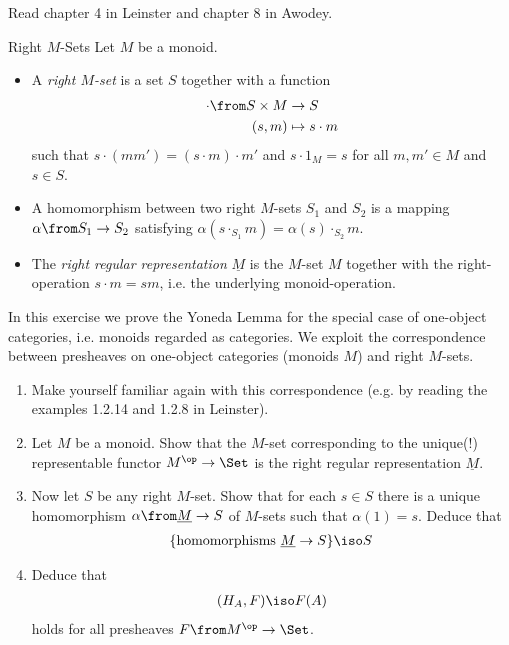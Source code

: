 \def\pathToRoot{../../}



\author{Dominik Wagner}

\begin{hint}
  Read chapter 4 in Leinster and chapter 8 in Awodey.
\end{hint}

\begin{definition}{Right $M$-Sets}
  Let $M$ be a monoid. 
  \begin{itemize}
  \item A \emph{right $M$-set} is a set $S$ together with a function
    \begin{align*}
      \cdot\from S\times M&\to S\\
      (s,m)&\mapsto s\cdot m
    \end{align*}
    such that $s\cdot (mm')=(s\cdot m)\cdot m'$ and $s\cdot 1_M=s$ for all $m,m'\in M$ and $s\in S$.
    \item A homomorphism between two right $M$-sets $S_1$ and $S_2$ is a mapping $\alpha\from S_1\to S_2$ satisfying $\alpha(s\cdot_{S_1} m)=\alpha(s)\cdot_{S_2}m$.
    \item The \emph{right regular representation} $\underline{M}$ is the $M$-set $M$ together with the right-operation $s\cdot m=sm$, i.e. the underlying monoid-operation.
  \end{itemize}

\end{definition}

\begin{exercise}
  In this exercise we prove the Yoneda Lemma for the special case of one-object categories, i.e. monoids regarded as categories.
  We exploit the correspondence between presheaves on one-object categories (monoids $M$) and right $M$-sets.

  \begin{enumerate}
  \item Make yourself familiar again with this correspondence (e.g. by reading the examples 1.2.14 and 1.2.8 in Leinster).
  \item Let $M$ be a monoid. Show that the $M$-set corresponding to the unique(!) representable functor $M^\op\to \Set$ is the right regular representation $\underline M$.
  \item Now let $S$ be any right $M$-set. Show that for each $s\in S$ there is a unique homomorphism $\alpha\from\underline M\to S$ of $M$-sets such that $\alpha(1)=s$. Deduce that 
    \begin{align*}
      \{\text{homomorphisms }\underline M\to S\}\iso S
    \end{align*}
  \item Deduce that
    \begin{align*}
      [M^\op,\Set](H_A, F)\iso F(A)
    \end{align*}
    holds for all presheaves $F\from M^\op\to\Set$.
  \end{enumerate}
\end{exercise}

